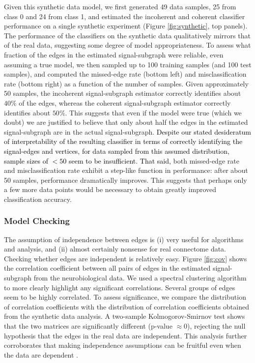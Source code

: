 \documentclass[10pt,journal,cspaper,compsoc]{IEEEtran}
\providecommand{\tk}[1]{\textcolor{black}{#1}}
\newcommand{\comment}[1]{}
\begin{document}
Given this synthetic data model, we first generated 49 data samples, 25 from class 0 and 24 from class 1, and estimated the incoherent and coherent classifier performance on a single synthetic experiment (Figure \ref{fig:synthetic}, top panels).  The performance of the classifiers on the synthetic data qualitatively mirrors that of the real data, suggesting some degree of model appropriateness.  To assess what fraction of the edges in the estimated signal-subgraph were reliable, even assuming a true model, we then sampled up to 100 training samples (and 100 test samples), and computed the missed-edge rate (bottom left) and misclassification rate (bottom right) as a function of the number of samples.  Given approximately 50 samples, the incoherent signal-subgraph estimator correctly identifies about $40\%$ of the edges, whereas the coherent signal-subgraph estimator correctly identifies about $50\%$.  This suggests that even if the model were true (which we doubt) we are justified to believe that only about half the edges in the estimated signal-subgraph are in the actual signal-subgraph.  
\tk{Despite  our stated desideratum of interpretability of the resulting classifier in terms of correctly identifying the signal-edges and vertices, for data sampled from this assumed distribution, sample sizes of $<50$ seem to be insufficient.  That said, }
\comment{Moreover,} both missed-edge rate and misclassification rate exhibit a step-like function in performance: after about 50 samples, performance dramatically improves.  This suggests that perhaps only a few more data points would be necessary to obtain greatly improved classification accuracy.  


\subsubsection{Model Checking} %
\label{ssub:model_checking}


The assumption of independence between edges is (i) very useful for algorithms and analysis, and (ii) almost certainly nonsense for real connectome data.  Checking whether edges are independent is relatively easy.  Figure \ref{fig:cov} shows the correlation coefficient between all pairs of edges in the estimated signal-subgraph from the neurobiological data.  We used a spectral clustering algorithm \cite{Dhillon2001} to  more clearly highlight any significant correlations.  Several groups of edges seem to be highly correlated.  To assess significance, we compare the distribution of correlation coefficients with the distribution of correlation coefficients obtained from the synthetic data analysis.  A two-sample Kolmogorov-Smirnov test shows that the two matrices are significantly different (p-value $\approx 0$), rejecting the null hypothesis that the edges in the real data are independent. This analysis further corroborates that making independence assumptions can be fruitful even when the data are dependent \cite{Hand2001}.
\end{document}
